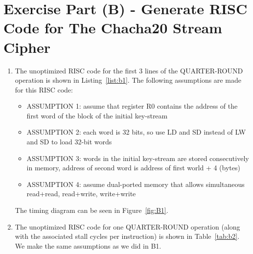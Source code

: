 \section*{Exercise Part (B) - Generate RISC Code for The Chacha20 Stream Cipher}

\begin{enumerate}[wide, label=(B\arabic*)]

\item The unoptimized RISC code for the first 3 lines of the QUARTER-ROUND operation is shown in Listing~\ref{list:b1}. The following assumptions are made for this RISC code:
\begin{itemize}
	\item ASSUMPTION 1: assume that register R0 contains the address of the first word of the block of the initial key-stream
	\item ASSUMPTION 2: each word is 32 bits, so use LD and SD instead of LW and SD to load 32-bit words
	\item ASSUMPTION 3: words in the initial key-stream are stored consecutively in memory, address of second word is address of first world + 4 (bytes)
	\item ASSUMPTION 4: assume dual-ported memory that allows simultaneous read+read, read+write, write+write
\end{itemize}

The timing diagram can be seen in Figure~\ref{fig:B1}. %

\item The unoptimized RISC code for one QUARTER-ROUND operation (along with the associated stall cycles per instruction) is shown in Table~\ref{tab:b2}. We make the same assumptions as we did in B1.



\end{enumerate}
